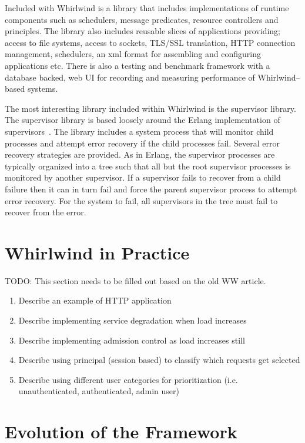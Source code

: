 \documentclass[conference]{IEEEtran}
\begin{document}
Included with Whirlwind is a library that includes implementations of runtime components such as schedulers, message predicates, resource controllers and principles. The library also includes reusable slices of applications providing; access to file systems, access to sockets, TLS/SSL translation, HTTP connection management, schedulers, an xml format for assembling and configuring applications etc. There is also a testing and benchmark framework with a database backed, web UI for recording and measuring performance of Whirlwind--based systems.

The most interesting library included within Whirlwind is the supervisor library. The supervisor library is based loosely around the Erlang implementation of supervisors~\cite{Armstrong03Thesis}. The library includes a system process that will monitor child processes and attempt error recovery if the child processes fail. Several error recovery strategies are provided. As in Erlang, the supervisor processes are typically organized into a tree such that all but the root supervisor processes is monitored by another supervisor. If a supervisor fails to recover from a child failure then it can in turn fail and force the parent supervisor process to attempt error recovery. For the system to fail, all supervisors in the tree must fail to recover from the error. 

\section{Whirlwind in Practice}

TODO: This section needs to be filled out based on the old WW article.

\begin{enumerate}
	\item Describe an example of HTTP application
	\item Describe implementing service degradation when load increases
	\item Describe implementing admission control as load increases still
	\item Describe using principal (session based) to classify which requests get selected
	\item Describe using different user categories for prioritization (i.e. unauthenticated, authenticated, admin user)
\end{enumerate}

\section{Evolution of the Framework}
\end{document}
